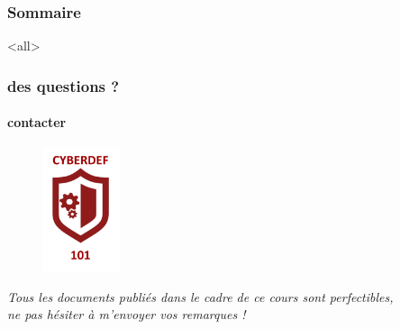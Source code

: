 

\begin{frame}
 \frametitle{Sommaire}
      \begin{multicols}{2}
         \tableofcontents[hideallsubsections]
     \end{multicols}
 \end{frame}

\mode<all>{\ubody}

\begin{frame}
 \frametitle{des questions ?}
  \framesubtitle{contacter \umaila}
  					\begin{figure}
  					 \centering
   						 \includegraphics[width=0.2\textwidth]{Tex/template.inc/Commons/CommonsPictures/cyberdef101.pdf}\\
				  \end{figure}
				 	 \centering \textit{Tous les documents publiés dans le cadre de ce cours sont perfectibles, \\ne pas hésiter à m'envoyer vos remarques !}
 \end{frame}

